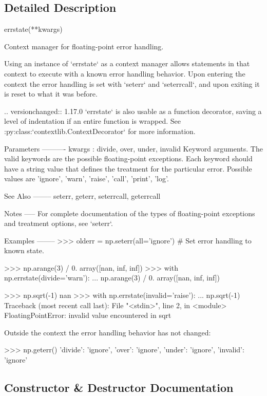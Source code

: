 \subsection{Detailed Description}
\begin{DoxyVerb}errstate(**kwargs)

Context manager for floating-point error handling.

Using an instance of `errstate` as a context manager allows statements in
that context to execute with a known error handling behavior. Upon entering
the context the error handling is set with `seterr` and `seterrcall`, and
upon exiting it is reset to what it was before.

..  versionchanged:: 1.17.0
    `errstate` is also usable as a function decorator, saving
    a level of indentation if an entire function is wrapped.
    See :py:class:`contextlib.ContextDecorator` for more information.

Parameters
----------
kwargs : {divide, over, under, invalid}
    Keyword arguments. The valid keywords are the possible floating-point
    exceptions. Each keyword should have a string value that defines the
    treatment for the particular error. Possible values are
    {'ignore', 'warn', 'raise', 'call', 'print', 'log'}.

See Also
--------
seterr, geterr, seterrcall, geterrcall

Notes
-----
For complete documentation of the types of floating-point exceptions and
treatment options, see `seterr`.

Examples
--------
>>> olderr = np.seterr(all='ignore')  # Set error handling to known state.

>>> np.arange(3) / 0.
array([nan, inf, inf])
>>> with np.errstate(divide='warn'):
...     np.arange(3) / 0.
array([nan, inf, inf])

>>> np.sqrt(-1)
nan
>>> with np.errstate(invalid='raise'):
...     np.sqrt(-1)
Traceback (most recent call last):
  File "<stdin>", line 2, in <module>
FloatingPointError: invalid value encountered in sqrt

Outside the context the error handling behavior has not changed:

>>> np.geterr()
{'divide': 'ignore', 'over': 'ignore', 'under': 'ignore', 'invalid': 'ignore'}\end{DoxyVerb}
 

\subsection{Constructor \& Destructor Documentation}
\mbox{\label{classnumpy_1_1core_1_1__ufunc__config_1_1errstate_a34addaf353e08a4f0487e9bf765aed4d}} 

